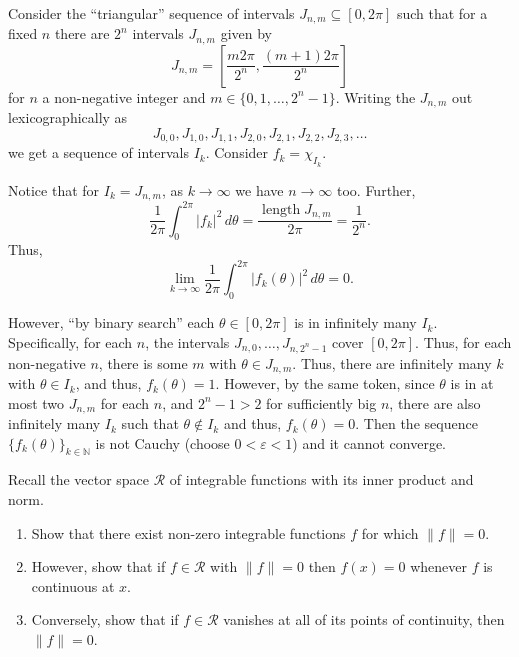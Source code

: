 \documentclass[12 pt, letterpaper]{hmcpset}
\begin{document}
\begin{solution}
	Consider the ``triangular'' sequence of intervals $J_{n, m} \subseteq [0, 2 \pi]$ such that for a fixed $n$ there are $2^{n}$ intervals $J_{n, m}$ given by
	 \[
		J_{n, m} = \left [ \frac{m 2 \pi}{2^{n}}, \frac{(m + 1) 2 \pi}{2^{n}} \right ]
	\]
	for $n$ a non-negative integer and $m \in \{ 0, 1, \dots, 2^{n} - 1 \}$. Writing the $J_{n, m}$ out lexicographically as
	\[
		J_{0, 0}, J_{1, 0}, J_{1, 1}, J_{2, 0}, J_{2, 1}, J_{2, 2}, J_{2, 3}, \dots
	\]
	we get a sequence of intervals $I_{k}$. Consider $f_{k} = \chi_{I_{k}}$.

	Notice that for $I_{k} = J_{n, m}$, as $k \to \infty$ we have $n \to \infty$ too. Further,
	\[
		\frac{1}{2 \pi} \int_{0}^{2 \pi} \lvert f_{k} \rvert^{2} \, d\theta = \frac{\operatorname{length} J_{n, m}}{2 \pi} = \frac{1}{2^{n}}.
	\]
	Thus,
	\[
		\lim_{k \to \infty} \frac{1}{2 \pi} \int_{0}^{2 \pi} \lvert f_{k}(\theta) \rvert^{2} \, d\theta = 0.
	\]

	However, ``by binary search'' each  $\theta \in [0, 2 \pi]$ is in infinitely many $I_{k}$. Specifically, for each $n$, the intervals $J_{n, 0}, \dots, J_{n, 2^{n} - 1}$ cover $[0, 2 \pi]$. Thus, for each non-negative $n$, there is some $m$ with $\theta \in J_{n, m}$. Thus, there are infinitely many $k$ with $\theta \in I_{k}$, and thus, $f_{k}(\theta) = 1$. However, by the same token, since $\theta$ is in at most two $J_{n, m}$ for each $n$, and $2^{n} - 1 > 2$ for sufficiently big $n$, there are also infinitely many $I_{k}$ such that $\theta \notin I_{k}$ and thus, $f_{k}(\theta) = 0$. Then the sequence $\{ f_{k}(\theta) \}_{k \in \mathbb{N}}$ is not Cauchy (choose $0 < \varepsilon < 1$) and it cannot converge.
\end{solution}

\pagebreak

\begin{problem}[S \& S \S 3.3 \#4.]
	Recall the vector space $\mathcal{R}$ of integrable functions with its inner product and norm.
	\begin{enumerate}
		\item Show that there exist non-zero integrable functions $f$ for which $\lVert f \rVert = 0$.
		\item However, show that if $f \in \mathcal{R}$ with $\lVert f \rVert = 0$ then $f(x) = 0$ whenever $f$ is continuous at $x$.
		\item Conversely, show that if $f \in \mathcal{R}$ vanishes at all of its points of continuity, then $\lVert f \rVert = 0$.
	\end{enumerate}
\end{problem}
\end{document}
